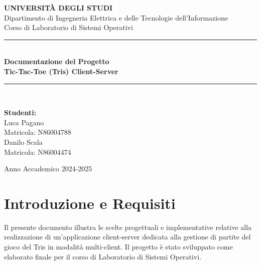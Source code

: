 \documentclass[11pt, a4paper]{article}
\begin{document}
\begin{titlepage}
    \centering
    \vspace*{1cm}
    
    {\Large \textbf{UNIVERSITÀ DEGLI STUDI}}\\[0.5cm]
    {\large Dipartimento di Ingegneria Elettrica e delle Tecnologie dell'Informazione}\\[2cm]
    
    {\Large Corso di Laboratorio di Sistemi Operativi}\\[2.5cm]
    
    \rule{\textwidth}{0.4pt}\\[0.5cm]
    {\huge \textbf{Documentazione del Progetto\\[0.5cm] Tic-Tac-Toe (Tris) Client-Server}}\\[0.4cm]
    \rule{\textwidth}{0.4pt}\\[3cm]
    
    \begin{flushleft}
        \Large
        \textbf{Studenti:}\\
        Luca Pagano\\
        \normalsize Matricola: N86004788\\
        \Large
        Danilo Scala\\
        \normalsize Matricola: N86004474\\
    \end{flushleft}
    
    \vfill
    
    {\large Anno Accademico 2024-2025}\\[1cm]
    
\end{titlepage}

\newpage
\tableofcontents
\newpage

\section{Introduzione e Requisiti}

Il presente documento illustra le scelte progettuali e implementative relative alla realizzazione di un'applicazione client-server dedicata alla gestione di partite del gioco del Tris in modalità multi-client. Il progetto è stato sviluppato come elaborato finale per il corso di Laboratorio di Sistemi Operativi.
\end{document}
